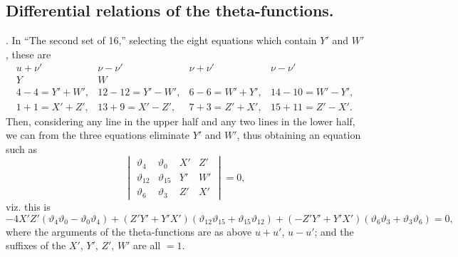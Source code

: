 \documentclass[12pt]{article}
\theoremstyle{plain}
\begin{document}
\subsection*{Differential relations of the theta-functions.}

. In ``The second set of 16,'' selecting the eight equations which contain $Y'$ and $W'$, these are
\[
\begin{array}{c|c|c|c}
u + \nu' & \nu - \nu' & \nu + \nu' & \nu - \nu' \\
\hline
Y & W & & \\
\hline
4 - 4 = Y' + W', & 12 - 12 = Y' - W', & 6 - 6 = W' + Y', & 14 - 10 = W' - Y', \\
1 + 1 = X' + Z', & 13 + 9 = X' - Z', & 7 + 3 = Z' + X', & 15 + 11 = Z' - X'.
\end{array}
\]
Then, considering any line in the upper half and any two lines in the lower half, we can from the three equations eliminate $Y'$ and $W'$, thus obtaining an equation such as
\[
\begin{vmatrix}
\vartheta_4 & \vartheta_0 & X' & Z' \\
\vartheta_{12} & \vartheta_{15} & Y' & W' \\
\vartheta_6 & \vartheta_3 & Z' & X'
\end{vmatrix}
= 0,
\]
viz. this is
\[
-4X'Z'(\vartheta_4 \vartheta_0 - \vartheta_0 \vartheta_4) + (Z'Y' + Y'X')(\vartheta_{12} \vartheta_{15} + \vartheta_{15} \vartheta_{12}) + (-Z'Y' + Y'X')(\vartheta_6 \vartheta_3 + \vartheta_3 \vartheta_6) = 0,
\]
where the arguments of the theta-functions are as above $u+u'$, $u-u'$; and the suffixes of the $X'$, $Y'$, $Z'$, $W'$ are all $= 1$.

\newpage
\setcounter{page}{561}
\end{document}
